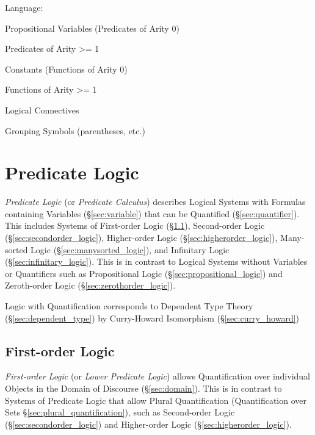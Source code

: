 
Language:

Propositional Variables (Predicates of Arity 0)

Predicates of Arity >= 1

Constants (Functions of Arity 0)

Functions of Arity >= 1

Logical Connectives

Grouping Symbols (parentheses, etc.)



\section{Predicate Logic}\label{sec:predicate_logic}

\emph{Predicate Logic} (or \emph{Predicate Calculus}) describes Logical Systems
with Formulas containing Variables (\S\ref{sec:variable}) that can be Quantified
(\S\ref{sec:quantifier}). This includes Systems of First-order Logic
(\S\ref{sec:firstorder_logic}), Second-order Logic
(\S\ref{sec:secondorder_logic}), Higher-order Logic
(\S\ref{sec:higherorder_logic}), Many-sorted Logic
(\S\ref{sec:manysorted_logic}), and Infinitary Logic
(\S\ref{sec:infinitary_logic}). This is in contrast to Logical Systems without
Variables or Quantifiers such as Propositional Logic
(\S\ref{sec:propositional_logic}) and Zeroth-order Logic
(\S\ref{sec:zerothorder_logic}).

Logic with Quantification corresponds to Dependent Type Theory
(\S\ref{sec:dependent_type}) by Curry-Howard Isomorphism
(\S\ref{sec:curry_howard})



\subsection{First-order Logic}\label{sec:firstorder_logic}

\emph{First-order Logic} (or \emph{Lower Predicate Logic}) allows Quantification
over individual Objects in the Domain of Discourse (\S\ref{sec:domain}). This is
in contrast to Systems of Predicate Logic that allow Plural Quantification
(Quantification over Sets \S\ref{sec:plural_quantification}), such as
Second-order Logic (\S\ref{sec:secondorder_logic}) and Higher-order Logic
(\S\ref{sec:higherorder_logic}).

